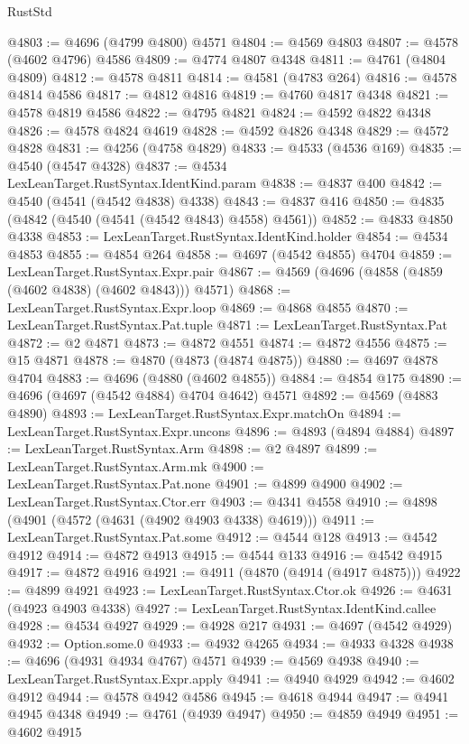\begin{lexlean}{RustStd}
\begin{coremodule}
@4803 := @4696 (@4799 @4800) @4571
@4804 := @4569 @4803
@4807 := @4578 (@4602 @4796) @4586
@4809 := @4774 @4807 @4348
@4811 := @4761 (@4804 @4809)
@4812 := @4578 @4811
@4814 := @4581 (@4783 @264)
@4816 := @4578 @4814 @4586
@4817 := @4812 @4816
@4819 := @4760 @4817 @4348
@4821 := @4578 @4819 @4586
@4822 := @4795 @4821
@4824 := @4592 @4822 @4348
@4826 := @4578 @4824 @4619
@4828 := @4592 @4826 @4348
@4829 := @4572 @4828
@4831 := @4256 (@4758 @4829)
@4833 := @4533 (@4536 @169)
@4835 := @4540 (@4547 @4328)
@4837 := @4534 LexLeanTarget.RustSyntax.IdentKind.param
@4838 := @4837 @400
@4842 := @4540 (@4541 (@4542 @4838) @4338)
@4843 := @4837 @416
@4850 := @4835 (@4842 (@4540 (@4541 (@4542 @4843) @4558) @4561))
@4852 := @4833 @4850 @4338
@4853 := LexLeanTarget.RustSyntax.IdentKind.holder
@4854 := @4534 @4853
@4855 := @4854 @264
@4858 := @4697 (@4542 @4855) @4704
@4859 := LexLeanTarget.RustSyntax.Expr.pair
@4867 := @4569 (@4696 (@4858 (@4859 (@4602 @4838) (@4602 @4843))) @4571)
@4868 := LexLeanTarget.RustSyntax.Expr.loop
@4869 := @4868 @4855
@4870 := LexLeanTarget.RustSyntax.Pat.tuple
@4871 := LexLeanTarget.RustSyntax.Pat
@4872 := @2 @4871
@4873 := @4872 @4551
@4874 := @4872 @4556
@4875 := @15 @4871
@4878 := @4870 (@4873 (@4874 @4875))
@4880 := @4697 @4878 @4704
@4883 := @4696 (@4880 (@4602 @4855))
@4884 := @4854 @175
@4890 := @4696 (@4697 (@4542 @4884) @4704 @4642) @4571
@4892 := @4569 (@4883 @4890)
@4893 := LexLeanTarget.RustSyntax.Expr.matchOn
@4894 := LexLeanTarget.RustSyntax.Expr.uncons
@4896 := @4893 (@4894 @4884)
@4897 := LexLeanTarget.RustSyntax.Arm
@4898 := @2 @4897
@4899 := LexLeanTarget.RustSyntax.Arm.mk
@4900 := LexLeanTarget.RustSyntax.Pat.none
@4901 := @4899 @4900
@4902 := LexLeanTarget.RustSyntax.Ctor.err
@4903 := @4341 @4558
@4910 := @4898 (@4901 (@4572 (@4631 (@4902 @4903 @4338) @4619)))
@4911 := LexLeanTarget.RustSyntax.Pat.some
@4912 := @4544 @128
@4913 := @4542 @4912
@4914 := @4872 @4913
@4915 := @4544 @133
@4916 := @4542 @4915
@4917 := @4872 @4916
@4921 := @4911 (@4870 (@4914 (@4917 @4875)))
@4922 := @4899 @4921
@4923 := LexLeanTarget.RustSyntax.Ctor.ok
@4926 := @4631 (@4923 @4903 @4338)
@4927 := LexLeanTarget.RustSyntax.IdentKind.callee
@4928 := @4534 @4927
@4929 := @4928 @217
@4931 := @4697 (@4542 @4929)
@4932 := Option.some.{0}
@4933 := @4932 @4265
@4934 := @4933 @4328
@4938 := @4696 (@4931 @4934 @4767) @4571
@4939 := @4569 @4938
@4940 := LexLeanTarget.RustSyntax.Expr.apply
@4941 := @4940 @4929
@4942 := @4602 @4912
@4944 := @4578 @4942 @4586
@4945 := @4618 @4944
@4947 := @4941 @4945 @4348
@4949 := @4761 (@4939 @4947)
@4950 := @4859 @4949
@4951 := @4602 @4915

\end{coremodule}
\end{lexlean}
